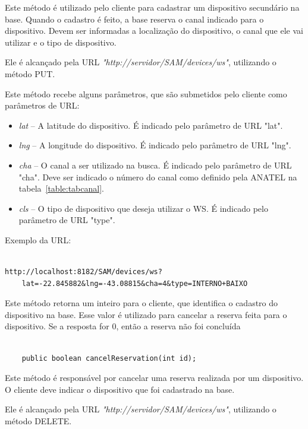 Este método é utilizado pelo cliente para cadastrar um dispositivo secundário na base. Quando o cadastro é feito, a base reserva o canal indicado para o dispositivo. Devem ser informadas a localização do dispositivo, o canal que ele vai utilizar e o tipo de dispositivo.

Ele é alcançado pela URL \textit{"http://servidor/SAM/devices/ws"}, utilizando o método PUT.

Este método recebe alguns parâmetros, que são submetidos pelo cliente como parâmetros de URL:

\begin{itemize}
\item \textit{lat} -- A latitude do dispositivo. É indicado pelo parâmetro de URL "lat".
\item \textit{lng} -- A longitude do dispositivo. É indicado pelo parâmetro de URL "lng".
\item \textit{cha} -- O canal a ser utilizado na busca. É indicado pelo parâmetro de URL "cha". Deve ser indicado o número do canal como definido pela ANATEL na tabela~\ref{table:tabcanal}.
\item \textit{cls} -- O tipo de dispositivo que deseja utilizar o WS. É indicado pelo parâmetro de URL "type".
\end{itemize}


Exemplo da URL:

\begin{lstlisting}	

http://localhost:8182/SAM/devices/ws?
	lat=-22.845882&lng=-43.08815&cha=4&type=INTERNO+BAIXO

\end{lstlisting}


Este método retorna um inteiro para o cliente, que identifica o cadastro do dispositivo na base. Esse valor é utilizado para cancelar a reserva feita para o dispositivo. Se a resposta for 0, então a reserva não foi concluída

\begin{lstlisting}

	public boolean cancelReservation(int id);

\end{lstlisting}



Este método é responsável por cancelar uma reserva realizada por um dispositivo. O cliente deve indicar o dispositivo que foi cadastrado na base.

Ele é alcançado pela URL \textit{"http://servidor/SAM/devices/ws"}, utilizando o método DELETE.

